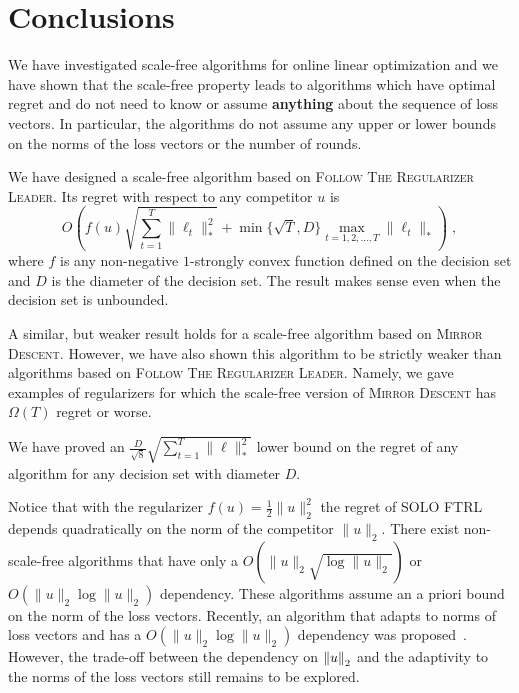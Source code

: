 \section{Conclusions}
\label{section:conclusions}

We have investigated scale-free algorithms for online linear optimization and
we have shown that the scale-free property leads to algorithms which have optimal
regret and do not need to know or assume \textbf{anything} about the sequence
of loss vectors. In particular, the algorithms do not assume any upper or lower
bounds on the norms of the loss vectors or the number of rounds.

We have designed a scale-free algorithm based on \textsc{Follow The Regularizer
Leader}. Its regret with respect to any competitor $u$ is
$$
O \left(f(u) \sqrt{\sum_{t=1}^T \|\ell_t\|_*^2}
+ \min\{\sqrt{T}, D\} \max_{t=1,2,\dots,T} \|\ell_t\|_* \right) \; ,
$$
where $f$ is any non-negative $1$-strongly convex
function defined on the decision set and $D$ is the diameter of the decision
set. The result makes sense even when the decision set is unbounded.

A similar, but weaker result holds for a scale-free algorithm based on
\textsc{Mirror Descent}. However, we have also shown this algorithm to be strictly
weaker than algorithms based on \textsc{Follow The Regularizer Leader}.
Namely, we gave examples of regularizers for which the scale-free version of
\textsc{Mirror Descent} has $\Omega(T)$ regret or worse.

We have proved an $\frac{D}{\sqrt{8}} \sqrt{\sum_{t=1}^T \|\ell\|_*^2}$ lower
bound on the regret of any algorithm for any decision set with diameter $D$.

Notice that with the regularizer $f(u) = \frac{1}{2}\|u\|_2^2$ the regret of
\textsc{SOLO FTRL} depends quadratically on the norm of the competitor
$\|u\|_2$. There exist non-scale-free algorithms \cite{McMahan-Streeter-2012,
McMahan-Abernethy-2013, Orabona-2013, McMahan-Orabona-2014, Orabona-2014,
Orabona-Pal-2016} that have only a $O(\|u\|_2 \sqrt{\log \|u\|_2})$ or
$O(\|u\|_2 \log \|u\|_2)$ dependency.  These algorithms assume an a priori bound
on the norm of the loss vectors. Recently, an algorithm that adapts to norms of
loss vectors and has a $O(\|u\|_2 \log \|u\|_2)$ dependency was
proposed~\cite{Cutkosky-Boahen-2016}. However, the trade-off between the
dependency on ${\left\|{u}\right\|}_2$ and the adaptivity to the norms of the loss vectors
still remains to be explored.
